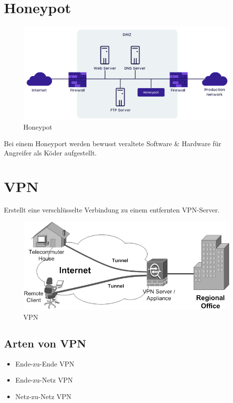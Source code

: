\section{Honeypot}
\begin{figure}[H]
	\centering
	\includegraphics[width=0.8\linewidth]{figures/honeypot.png}
	\caption{Honeypot}
\end{figure}
Bei einem Honeyport werden bewusst veraltete Software \& Hardware für Angreifer als Köder aufgestellt. 

\section{VPN} 
Erstellt eine verschlüsselte Verbindung zu einem entfernten VPN-Server.

\begin{figure}[H]
	\centering
	\includegraphics[width=0.8\linewidth]{figures/vpn.png}
	\caption{VPN}
\end{figure}
\subsection*{Arten von VPN}
\begin{itemize}
	\item Ende-zu-Ende VPN
	\item Ende-zu-Netz VPN
	\item Netz-zu-Netz VPN
\end{itemize}

